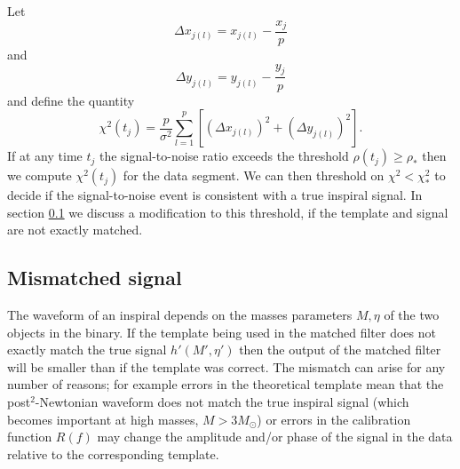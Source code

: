 Let
\begin{equation}
\Delta x_{j(l)} = x_{j(l)} - \frac{x_j}{p}
\end{equation}
and
\begin{equation}
\Delta y_{j(l)} = y_{j(l)} - \frac{y_j}{p}
\end{equation}
and define the quantity
\begin{equation}
\chi^2(t_j) = \frac{p}{\sigma^2} \sum_{l = 1}^p \left[ \left(\Delta x_{j(l)}\right)^2 + \left(\Delta y_{j(l)}\right)^2 \right].
\label{eq:chisqdefn}
\end{equation}
If at any time $t_j$ the signal-to-noise ratio
exceeds the threshold $\rho(t_j) \ge \rho_\ast$ then we compute $\chi^2(t_j)$
 for the data segment. We can then threshold on $\chi^2 < \chi^2_\ast$ to
decide if the signal-to-noise event is consistent with a true inspiral signal.
In section \ref{ss:mismatchedchisq} we discuss a modification to this
threshold, if the template and signal are not exactly matched.

\subsection{Mismatched signal}
\label{ss:mismatchedchisq}

The waveform of an inspiral depends on the masses parameters $M,\eta$ of the two
objects in the binary. If the template being used in the
matched filter does not exactly match the true signal
$h'(M',\eta')$ then the output of the matched filter will be smaller than if
the template was correct. The mismatch can arise for any number of reasons;
for example errors in the theoretical
template mean that the post$^2$-Newtonian waveform does not match the true
inspiral signal (which becomes important at high masses, $M > 3 M_\odot$) or
errors in the calibration function $R(f)$ may change the
amplitude and/or phase of the signal in the data relative to the corresponding
template.  

